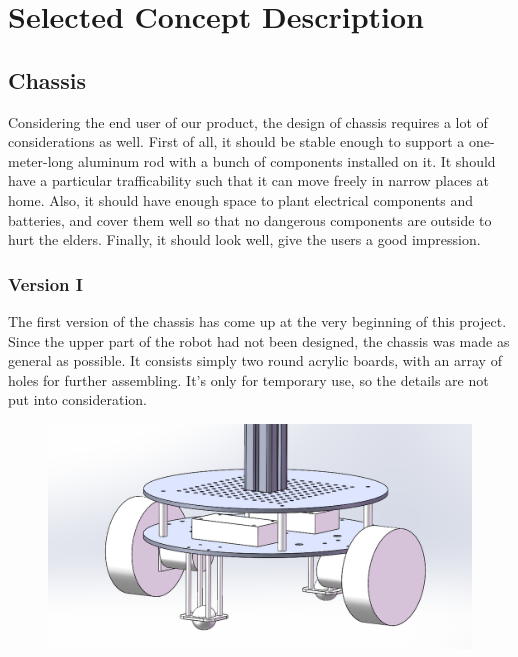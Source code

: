 \documentclass[12pt]{article}
\begin{document}
\section{Selected Concept Description}
\subsection{Chassis}
Considering the end user of our product, the design of chassis requires a lot of considerations as well. First of all, it should be stable enough to support a one-meter-long aluminum rod with a bunch of components installed on it. It should have a particular trafficability such that it can move freely in narrow places at home. Also, it should have enough space to plant electrical components and batteries, and cover them well so that no dangerous components are outside to hurt the elders. Finally, it should look well, give the users a good impression.
\subsubsection{Version I}
The first version of the chassis has come up at the very beginning of this project. Since the upper part of the robot had not been designed, the chassis was made as general as possible. It consists simply two round acrylic boards, with an array of holes for further assembling. It’s only for temporary use, so the details are not put into consideration.
\begin{figure}[H]
	\centering
	\includegraphics[width=0.7\linewidth]{Z1}
\end{figure}
\end{document}
